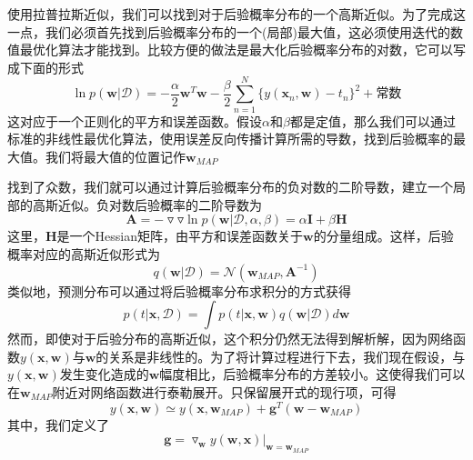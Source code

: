 使用拉普拉斯近似，我们可以找到对于后验概率分布的一个高斯近似。为了完成这一点，我们必须首先找到后验概率分布的一个(局部)最大值，这必须使用迭代的数值最优化算法才能找到。比较方便的做法是最大化后验概率分布的对数，它可以写成下面的形式
\begin{equation}
	\ln p(\boldsymbol{w}|\mathcal{D})=-\frac{\alpha}{2}\boldsymbol{w}^T\boldsymbol{w}-\frac{\beta}{2}\sum_{n=1}^{N}\{y(\boldsymbol{x}_n,\boldsymbol{w})-t_n \}^2+\text{常数}
\end{equation}
这对应于一个正则化的平方和误差函数。假设$\alpha$和$\beta$都是定值，那么我们可以通过标准的非线性最优化算法，使用误差反向传播计算所需的导数，找到后验概率的最大值。我们将最大值的位置记作$\boldsymbol{w}_{MAP}$

找到了众数，我们就可以通过计算后验概率分布的负对数的二阶导数，建立一个局部的高斯近似。负对数后验概率的二阶导数为
\begin{equation}
	\boldsymbol{A}=-\triangledown\triangledown \ln p(\boldsymbol{w}|\mathcal{D},\alpha,\beta)=\alpha\boldsymbol{I}+\beta\boldsymbol{H}
\end{equation}
这里，$\boldsymbol{H}$是一个Hessian矩阵，由平方和误差函数关于$\boldsymbol{w}$的分量组成。这样，后验概率对应的高斯近似形式为
\begin{equation}
\label{5167}
	q(\boldsymbol{w}|\mathcal{D})=\mathcal{N}(\boldsymbol{w}_{MAP},\boldsymbol{A}^{-1})
\end{equation}
类似地，预测分布可以通过将后验概率分布求积分的方式获得
\begin{equation}
\label{5168}
	p(t|\boldsymbol{x},\mathcal{D})=\int p(t|\boldsymbol{x},\boldsymbol{w})q(\boldsymbol{w}|\mathcal{D})d\boldsymbol{w}
\end{equation}
然而，即使对于后验分布的高斯近似，这个积分仍然无法得到解析解，因为网络函数$y(\boldsymbol{x},\boldsymbol{w})$与$\boldsymbol{w}$的关系是非线性的。为了将计算过程进行下去，我们现在假设，与$y(\boldsymbol{x},\boldsymbol{w})$发生变化造成的$\boldsymbol{w}$幅度相比，后验概率分布的方差较小。这使得我们可以在$\boldsymbol{w}_{MAP}$附近对网络函数进行泰勒展开。只保留展开式的现行项，可得
\begin{equation}
	y(\boldsymbol{x},\boldsymbol{w})\simeq y(\boldsymbol{x},\boldsymbol{w}_{MAP})+\boldsymbol{g}^T(\boldsymbol{w}-\boldsymbol{w}_{MAP})
\end{equation}
其中，我们定义了
\begin{equation}
	\boldsymbol{g}=\triangledown_{\boldsymbol{w}}y(\boldsymbol{w},\boldsymbol{x})|_{\boldsymbol{w}=\boldsymbol{w}_{MAP}}
\end{equation}
